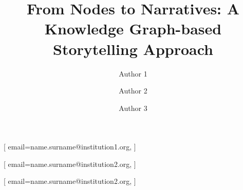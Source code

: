 \documentclass[
hf, %
]{ceurart}
\begin{document}


\title{From Nodes to Narratives: A Knowledge Graph-based Storytelling Approach}

\author[1]{Author 1}[%
	email=name.surname@institution1.org,
]
\cormark[1]

\author[2]{Author 2}[%
	email=name.surname@institution2.org,
]
\cormark[1]

\author[2]{Author 3}[%
	email=name.surname@institution2.org,
]

\address[1]{Institution 1, City 1, Country 1}

\address[2]{Institution 2, City 2, Country 2}











\end{document}
